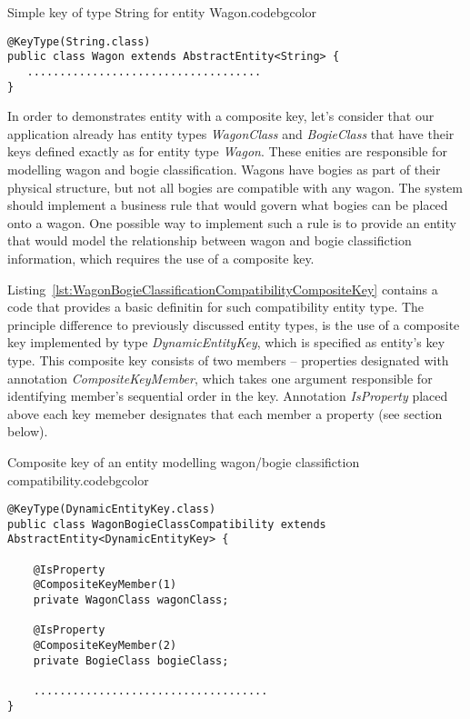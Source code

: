   \begin{code}{Simple key of type String for entity Wagon.}{\label{lst:WagonSimpleKey}}{codebgcolor}
    \begin{lstlisting}
@KeyType(String.class)
public class Wagon extends AbstractEntity<String> {
   ....................................
}
    \end{lstlisting}
  \end{code}

  In order to demonstrates entity with a composite key, let's consider that our application already has entity types \emph{WagonClass} and \emph{BogieClass} that have their keys defined exactly as for entity type \emph{Wagon}.
  These enities are responsible for modelling wagon and bogie classification.
  Wagons have bogies as part of their physical structure, but not all bogies are compatible with any wagon.
  The system should implement a business rule that would govern what bogies can be placed onto a wagon. 
  One possible way to implement such a rule is to provide an entity that would model the relationship between wagon and bogie classifiction information, which requires the use of a composite key.
  
  Listing~\ref{lst:WagonBogieClassificationCompatibilityCompositeKey} contains a code that provides a basic definitin for such compatibility entity type.
  The principle difference to previously discussed entity types, is the use of a composite key implemented by type \emph{DynamicEntityKey}, which is specified as entity's key type.
  This composite key consists of two members -- properties designated with annotation \emph{CompositeKeyMember}, which takes one argument responsible for identifying member's sequential order in the key.
  Annotation \emph{IsProperty} placed above each key memeber designates that each member a property (see section below).


  \begin{code}{Composite key of an entity modelling wagon/bogie classifiction compatibility.}{\label{lst:WagonBogieClassificationCompatibilityCompositeKey}}{codebgcolor}
    \begin{lstlisting}
@KeyType(DynamicEntityKey.class)
public class WagonBogieClassCompatibility extends AbstractEntity<DynamicEntityKey> {

    @IsProperty
    @CompositeKeyMember(1)
    private WagonClass wagonClass;

    @IsProperty
    @CompositeKeyMember(2)
    private BogieClass bogieClass;

    ....................................
}
    \end{lstlisting}
  \end{code}

